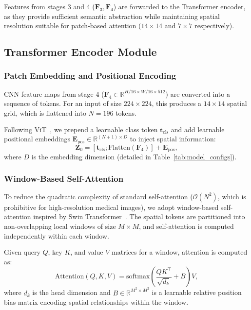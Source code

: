 Features from stages 3 and 4 ($\mathbf{F}_3, \mathbf{F}_4$) are forwarded to the Transformer encoder, as they provide sufficient semantic abstraction while maintaining spatial resolution suitable for patch-based attention ($14 \times 14$ and $7 \times 7$ respectively).

\subsection{Transformer Encoder Module}
\label{subsec:transformer}

\subsubsection{Patch Embedding and Positional Encoding}

CNN feature maps from stage 4 ($\mathbf{F}_4 \in \mathbb{R}^{H/16 \times W/16 \times 512}$) are converted into a sequence of tokens. For an input of size $224 \times 224$, this produces a $14 \times 14$ spatial grid, which is flattened into $N = 196$ tokens.

Following ViT~\cite{dosovitskiy2021vit}, we prepend a learnable class token $\mathbf{t}_{\text{cls}}$ and add learnable positional embeddings $\mathbf{E}_{\text{pos}} \in \mathbb{R}^{(N+1) \times D}$ to inject spatial information:
\begin{equation}
\mathbf{Z}_0 = [\mathbf{t}_{\text{cls}}; \text{Flatten}(\mathbf{F}_4)] + \mathbf{E}_{\text{pos}},
\end{equation}
where $D$ is the embedding dimension (detailed in Table~\ref{tab:model_configs}).

\subsubsection{Window-Based Self-Attention}

To reduce the quadratic complexity of standard self-attention ($\mathcal{O}(N^2)$, which is prohibitive for high-resolution medical images), we adopt window-based self-attention inspired by Swin Transformer~\cite{liu2021swin}. The spatial tokens are partitioned into non-overlapping local windows of size $M \times M$, and self-attention is computed independently within each window.

Given query $Q$, key $K$, and value $V$ matrices for a window, attention is computed as:
\begin{equation}
\mathrm{Attention}(Q,K,V) =
\mathrm{softmax}\!\left(\frac{QK^\top}{\sqrt{d_k}} + B\right)V,
\end{equation}
where $d_k$ is the head dimension and $B \in \mathbb{R}^{M^2 \times M^2}$ is a learnable relative position bias matrix encoding spatial relationships within the window.

